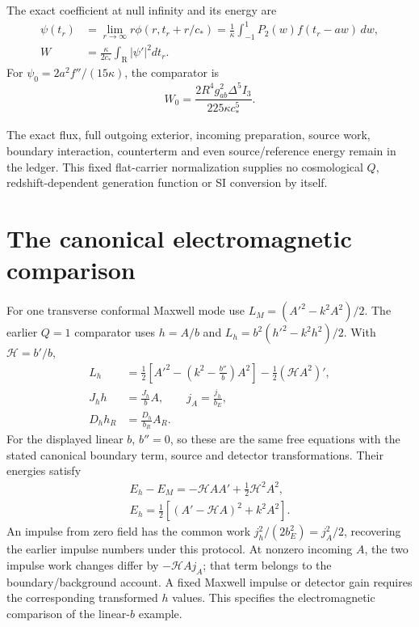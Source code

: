 The exact coefficient at null infinity and its energy are
\begin{align}
 \psi(t_r)&=\lim_{r\to\infty}r\phi(r,t_r+r/c_*)
       =\frac1\kappa\int_{-1}^1P_2(w)f(t_r-aw)\,dw,\\
 W&=\frac{\kappa}{2c_*}\int_{\mathrm R}|\psi'|^2dt_r.
\end{align}
For $\psi_0=2a^2f''/(15\kappa)$, the comparator is
\[
 W_0=\frac{2R^4g_{ab}^2\Delta^5I_3}{225\kappa c_*^5}.
\]


The exact flux, full outgoing exterior, incoming preparation, source work,
boundary interaction, counterterm and even source/reference energy remain in
the ledger. This fixed flat-carrier normalization supplies no cosmological
$Q$, redshift-dependent generation function or SI conversion by itself.

\section{The canonical electromagnetic comparison}
\label{sec:maxwell-canonical-comparator}
For one transverse conformal Maxwell mode use
$L_M=(A'^2-k^2A^2)/2$. The earlier $Q=1$ comparator uses $h=A/b$ and
$L_h=b^2(h'^2-k^2h^2)/2$. With $\mathcal H=b'/b$,
\begin{align}
 L_h&=\frac12\left[A'^2-
              \left(k^2-\frac{b''}{b}\right)A^2\right]
                   -\frac12(\mathcal H A^2)',\\
 J_hh&=\frac{J_h}{b}A,\qquad j_A=\frac{j_h}{b_E},\\
 D_hh_R&=\frac{D_h}{b_R}A_R.
\end{align}
For the displayed linear $b$, $b''=0$, so these are the same free equations
with the stated canonical boundary term, source and detector transformations.
Their energies satisfy
\[
 \begin{gathered}
 E_h-E_M=-\mathcal H AA'+\tfrac12\mathcal H^2A^2,\\
 E_h=\tfrac12[(A'-\mathcal H A)^2+k^2A^2].
 \end{gathered}
\]
An impulse from zero field has the common work
$j_h^2/(2b_E^2)=j_A^2/2$, recovering the earlier impulse numbers under this
protocol. At nonzero incoming $A$, the two impulse work changes differ by
$-\mathcal H A j_A$; that term belongs to the boundary/background account.
A fixed Maxwell impulse or detector gain requires the corresponding
transformed $h$ values. This specifies the electromagnetic comparison of
the linear-$b$ example.

